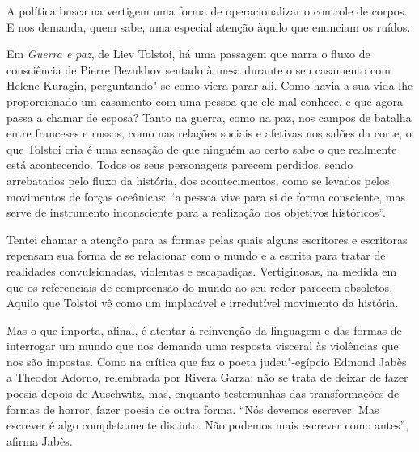 A política busca na vertigem uma forma de operacionalizar o controle de
corpos. E nos demanda, quem sabe, uma especial atenção àquilo que
enunciam os ruídos.

\asterisc

Em \emph{Guerra e paz}, de Liev Tolstoi, há uma passagem que narra o fluxo de
consciência de Pierre Bezukhov sentado à mesa durante o seu casamento
com Helene Kuragin, perguntando"-se como viera parar ali. Como havia a sua
vida lhe proporcionado um casamento com uma pessoa que ele mal conhece,
e que agora passa a chamar de esposa? Tanto na guerra, como na paz, nos
campos de batalha entre franceses e russos, como nas relações sociais e
afetivas nos salões da corte, o que Tolstoi cria é uma sensação de que
ninguém ao certo sabe o que realmente está acontecendo. Todos os seus
personagens parecem perdidos, sendo arrebatados pelo fluxo da história,
dos acontecimentos, como se levados pelos movimentos de forças
oceânicas: ``a pessoa vive para si de forma consciente, mas serve de
instrumento inconsciente para a realização dos objetivos históricos''.

Tentei chamar a atenção para as formas pelas quais alguns escritores e
escritoras repensam sua forma de se relacionar com o mundo e a escrita
para tratar de realidades convulsionadas, violentas e escapadiças.
Vertiginosas, na medida em que os referenciais de compreensão do
mundo ao seu redor parecem obsoletos. Aquilo que Tolstoi vê como um
implacável e irredutível movimento da história.


Mas o que importa, afinal, é atentar à reinvenção da linguagem e das
formas de interrogar um mundo que nos demanda uma resposta visceral às
violências que nos são impostas. Como na crítica que faz o poeta
judeu"-egípcio Edmond Jabès a Theodor Adorno, relembrada por Rivera
Garza: não se trata de deixar de fazer poesia depois de Auschwitz, mas,
enquanto testemunhas das transformações de formas de horror, fazer
poesia de outra forma. ``Nós devemos escrever. Mas escrever é algo
completamente distinto. Não podemos mais escrever como antes'', afirma
Jabès.

